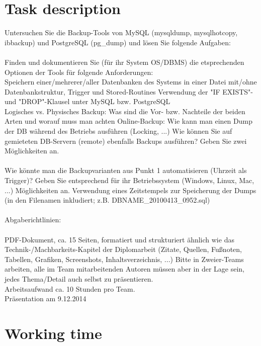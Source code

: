 \documentclass[10pt]{article}
\begin{document}
\section{Task description}
Untersuchen Sie die Backup-Tools von MySQL (mysqldump, mysqlhotcopy, ibbackup) und PostgreSQL (pg\_dump) und lösen Sie folgende Aufgaben:
\\ \\
Finden und dokumentieren Sie (für ihr System OS/DBMS) die etsprechenden Optionen der Tools für folgende Anforderungen: \\
Speichern einer/mehrerer/aller Datenbanken des Systems in einer Datei mit/ohne Datenbankstruktur, Trigger und Stored-Routines 
Verwendung der "IF EXISTS"- und "DROP"-Klausel unter MySQL bzw. PostgreSQL \\
Logisches vs. Physisches Backup: Was sind die Vor- bzw. Nachteile der beiden Arten und worauf muss man achten
Online-Backup: Wie kann man einen Dump der DB während des Betriebs ausführen (Locking, ...)
Wie können Sie auf gemieteten DB-Servern (remote) ebenfalls Backups ausführen? Geben Sie zwei Möglichkeiten an.
\\ \\
Wie könnte man die Backupvarianten aus Punkt 1 automatisieren (Uhrzeit als Trigger)? Geben Sie entsprechend für ihr Betriebssystem (Windows, Linux, Mac, ...) Möglichkeiten an.
Verwendung eines Zeitstempels zur Speicherung der Dumps (in den Filenamen inkludiert; z.B. DBNAME\_20100413\_0952.sql)
\\ \\
Abgaberichtlinien:
 \\ \\
PDF-Dokument, ca. 15 Seiten, formatiert und strukturiert ähnlich wie das Technik-/Machbarkeits-Kapitel der Diplomarbeit (Zitate, Quellen, Fußnoten, Tabellen, Grafiken, Screenshots, Inhaltsverzeichnis, ...)
Bitte in Zweier-Teams arbeiten, alle im Team mitarbeitenden Autoren müssen aber in der Lage sein, jedes Thema/Detail auch selbst zu präsentieren. \\
Arbeitsaufwand ca. 10 Stunden pro Team.  \\
Präsentation am 9.12.2014

\section{Working time}
\end{document}
